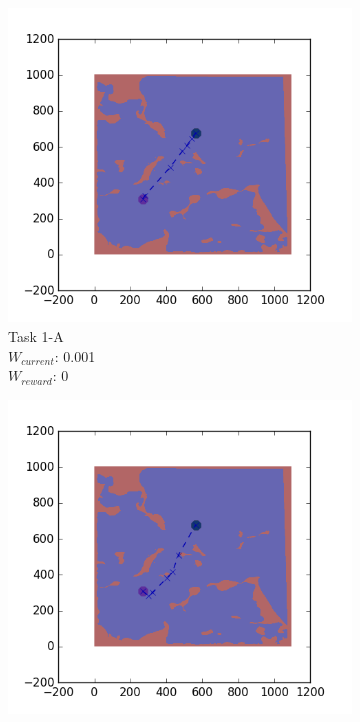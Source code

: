 \documentclass{tamuccthesis}
\begin{document}



\begin{figure}
    \centering
    \begin{subfigure}[b]{0.24\textwidth}
        \centering
        \includegraphics[width=\textwidth,trim={4cm 3cm 2cm 3cm},clip]{EXP3RG_PathAa_-1_-1_0d001_0.png}
        \caption[]{{\small Task 1-A \\ $W_{current}$: 0.001 \\ $W_{reward}$: 0}}    
        \label{fig:Path_1-A_upCurrent_noReward}
    \end{subfigure}
    \begin{subfigure}[b]{0.24\textwidth}  
        \centering 
        \includegraphics[width=\textwidth,trim={4cm 3cm 2cm 3cm},clip]{EXP3RG_PathAa_-1_-1_0d001_-1.png}

\end{subfigure}
\end{figure}
\end{document}
